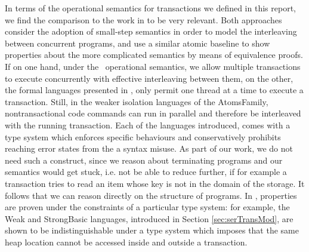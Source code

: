 	In terms of the operational semantics for transactions we defined in this report, we find the comparison to the work in \cite{semanticsTransactions} to be very relevant. Both approaches consider the adoption of small-step semantics in order to model the interleaving between concurrent programs, and use a similar atomic baseline to show properties about the more complicated semantics by means of equivalence proofs. If on one hand, under the \tpl\ operational semantics, we allow multiple transactions to execute concurrently with effective interleaving between them, on the other, the formal languages presented in \cite{semanticsTransactions}, only permit one thread at a time to execute a transaction. Still, in the weaker isolation languages of the \textsf{AtomsFamily}, nontransactional code commands can run in parallel and therefore be interleaved with the running transaction. Each of the languages introduced, comes with a type system which enforces specific behaviours and conservatively prohibits reaching error states from the a syntax misuse. As part of our work, we do not need such a construct, since we reason about terminating programs and our semantics would get stuck, i.e. not be able to reduce further, if for example a transaction tries to read an item whose key is not in the domain of the storage. It follows that we can reason directly on the structure of programs. In \cite{semanticsTransactions}, properties are proven under the constraints of a particular type system: for example, the \textsf{Weak} and \textsf{StrongBasic} languages, introduced in Section \ref{sec:serTransMod}, are shown to be indistinguishable under a type system which imposes that the same heap location cannot be accessed inside and outside a transaction.